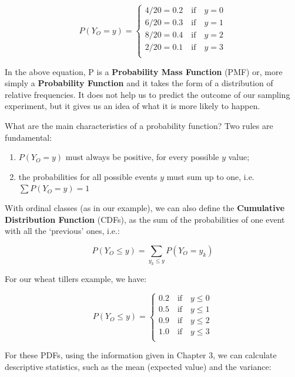 \documentclass[a4paper,12pt,oneside]{book}
\providecommand{\tightlist}{%
  \setlength{\itemsep}{0pt}\setlength{\parskip}{0pt}}
\begin{document}
\[P(Y_O = y) = \left\{ \begin{array}{l}
 4/20 = 0.2 \,\,\,\,\,\,\textrm{if}\,\,\,\,\,\, y = 0 \\ 
 6/20 = 0.3 \,\,\,\,\,\,\textrm{if}\,\,\,\,\,\, y = 1 \\ 
 8/20 = 0.4\,\,\,\,\,\, \textrm{if}\,\,\,\,\,\, y = 2 \\ 
 2/20 = 0.1 \,\,\,\,\,\,\textrm{if}\,\,\,\,\,\, y = 3 \\ 
 \end{array} \right.\]

In the above equation, P is a \textbf{Probability Mass Function} (PMF) or, more simply a \textbf{Probability Function} and it takes the form of a distribution of relative frequencies. It does not help us to predict the outcome of our sampling experiment, but it gives us an idea of what it is more likely to happen.

What are the main characteristics of a probability function? Two rules are fundamental:

\begin{enumerate}
\def\labelenumi{\arabic{enumi}.}
\tightlist
\item
  \(P(Y_O = y)\) must always be positive, for every possible \(y\) value;
\item
  the probabilities for all possible events \(y\) must sum up to one, i.e.~\(\sum{P \left(Y_O = y \right)} = 1\)
\end{enumerate}

With ordinal classes (as in our example), we can also define the \textbf{Cumulative Distribution Function} (CDFs), as the sum of the probabilities of one event with all the `previous' ones, i.e.:

\[P(Y_O \le y) = \sum_{y_k \le y}{P(Y_O = y_k)}\]

For our wheat tillers example, we have:

\[P(Y_O \le y) = \left\{ \begin{array}{l}
 0.2\,\,\,\,\,\,\textrm{if}\,\,\,\,\,\, y \leq 0 \\ 
 0.5\,\,\,\,\,\,\textrm{if}\,\,\,\,\,\, y \leq 1 \\ 
 0.9\,\,\,\,\,\,\textrm{if}\,\,\,\,\,\, y \leq 2 \\ 
 1.0\,\,\,\,\,\,\textrm{if}\,\,\,\,\,\, y \leq 3 \\ 
 \end{array} \right.\]

For these PDFs, using the information given in Chapter 3, we can calculate descriptive statistics, such as the mean (expected value) and the variance:
\end{document}
